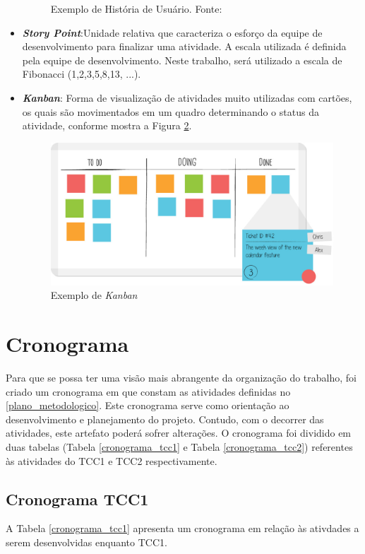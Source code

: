 \begin{itemize}
\begin{figure}[h!]
\caption{Exemplo de História de Usuário. Fonte: \cite{sabbagh_scrum:_2014}}
\label{img:us}
\end{figure}
\item \textit{\textbf{Story Point}}:Unidade relativa que caracteriza o esforço da equipe de desenvolvimento para finalizar uma atividade. A escala utilizada é definida pela equipe de desenvolvimento. Neste trabalho, será utilizado a escala de Fibonacci (1,2,3,5,8,13, ...). 
\item \textit{\textbf{Kanban}}: Forma de visualização de atividades muito utilizadas com cartões, os quais são movimentados em um quadro determinando o status da atividade, conforme mostra a Figura \ref{img:kanban}.
\graphicspath{{figuras/}}
\begin{figure}[h!]
\centering
\includegraphics[scale=0.40]{kanban}
\caption{Exemplo de \textit{Kanban}}
\label{img:kanban}
\end{figure}

\end{itemize}
\section{Cronograma}
\label{cronograma}
Para que se possa ter uma visão mais abrangente da organização do trabalho, foi criado um cronograma em que constam as atividades definidas no \ref{plano_metodologico}. Este cronograma serve como orientação ao desenvolvimento e planejamento do projeto. Contudo, com o decorrer das atividades, este artefato poderá sofrer alterações. O cronograma foi dividido em duas tabelas (Tabela \ref{cronograma_tcc1} e Tabela \ref{cronograma_tcc2}) referentes às atividades do TCC1 e TCC2 respectivamente.

\subsection{Cronograma TCC1}
A Tabela \ref{cronograma_tcc1} apresenta um cronograma em relação às ativdades a serem desenvolvidas enquanto TCC1.

